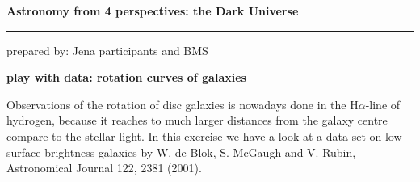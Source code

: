 \documentclass[a4paper,12pt]{article}
\newcommand{\HRule}{\rule{\linewidth}{0.3mm}}
\begin{document}
\pagestyle{empty}

\begin{center}
\LARGE \textbf{Astronomy from 4 perspectives: the Dark Universe}
\HRule
\end{center}
\begin{flushright}
prepared by: Jena participants and BMS
\end{flushright}
\begin{center}
{\Large \textbf{play with data: rotation curves of galaxies}}
\end{center}
\vspace{5mm}

\noindent
Observations of the rotation of disc galaxies is nowadays done in the H$\alpha$-line of hydrogen, because it reaches to much larger distances from the galaxy centre compare to the stellar light. In this exercise we have a look at a data set on low surface-brightness galaxies by W. de Blok, S. McGaugh and V. Rubin, Astronomical Journal 122, 2381 (2001).
\end{document}
